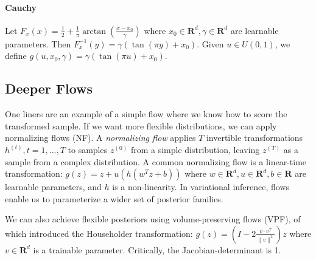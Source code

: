 \paragraph{Cauchy} Let $F_x(x) = \frac{1}{2} + \frac{1}{\pi}\arctan(\frac{x - x_0}{\gamma})$ where $x_0\in \mathbf{R}^d, \gamma\in \mathbf{R}^d$ are learnable parameters. Then $F_x^{-1}(y) = \gamma(\tan(\pi y) + x_0)$. Given $u \in U(0, 1)$, we define $g(u, x_0, \gamma) = \gamma(\tan(\pi u) + x_0)$.


\subsection{Deeper Flows}
One liners are an example of a simple flow where we know how to score the transformed sample. If we want more flexible distributions, we can apply normalizing flows (NF). A \textit{normalizing flow} \cite{rezende2015variational} applies $T$ invertible transformations $h^{(t)}, t = 1, ..., T$ to samples $z^{(0)}$ from a simple distribution, leaving $z^{(T)}$ as a sample from a complex distribution. A common normalizing flow is a linear-time transformation: $g(z) = z + u(h(w^{T}z + b))$ where $w\in \mathbf{R}^d, u\in \mathbf{R}^d, b\in \mathbf{R}$ are learnable parameters, and $h$ is a non-linearity. In variational inference, flows enable us to parameterize a wider set of posterior families.

We can also achieve flexible posteriors using volume-preserving flows (VPF), of which \cite{tomczak2016improving} introduced the Householder transformation: $g(z) = (I - 2\frac{v \cdot v^T}{\|v\|^2})z$ where $v \in \mathbf{R}^d$ is a trainable parameter. Critically, the Jacobian-determinant is 1.


